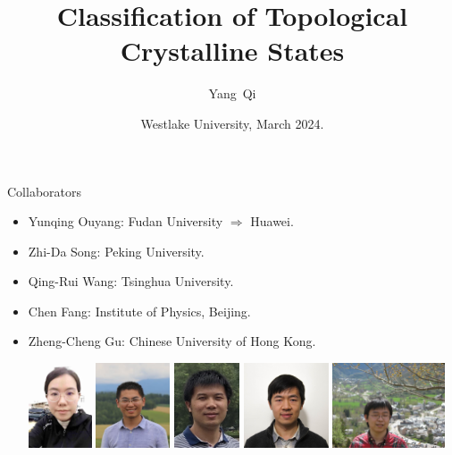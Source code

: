 \documentclass[xcolor=table, 11pt, aspectratio=169]{beamer}
\title[Space-group SPTs] %
{Classification of Topological Crystalline States}
\author[Y Qi] %
{Yang~Qi}
\institute[Fudan] %
{Department of Physics, Fudan University}
\date{Westlake University, March 2024.}
\begin{document}
\begin{frame}
  \titlepage
\end{frame}

\begin{frame}{Collaborators}
  \begin{itemize}
  \item Yunqing Ouyang: Fudan University $\Rightarrow$ Huawei.
  \item Zhi-Da Song: Peking University.
  \item Qing-Rui Wang: Tsinghua University.
  \item Chen Fang: Institute of Physics, Beijing.
  \item Zheng-Cheng Gu: Chinese University of Hong Kong.
    \begin{center}
      \includegraphics[height=2.5cm]{../people/yunqing}
      \includegraphics[height=2.5cm]{../people/zhidasong}
      \includegraphics[height=2.5cm]{../people/qingrui}      
      \includegraphics[height=2.5cm]{../people/chenfang}
      \includegraphics[height=2.5cm]{../people/zhengcheng}
    \end{center}
\end{itemize}
\end{frame}
\end{document}
